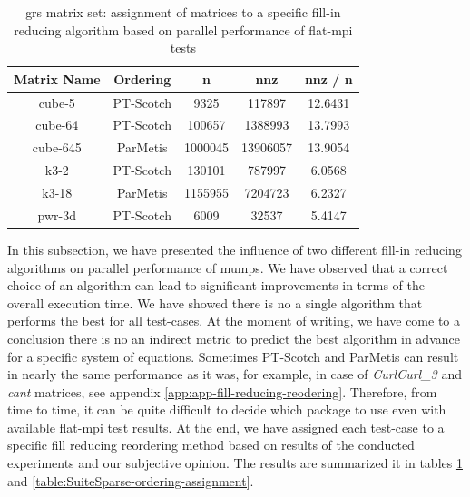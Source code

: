 \begin{table}[htpb]
\centering
\begin{tabular}{|c|c|c|c|c|}
\hline
Matrix Name & Ordering  & n       & nnz      & nnz / n \\ \hline
cube-5      & PT-Scotch & 9325    & 117897   & 12.6431 \\ \hline
cube-64     & PT-Scotch & 100657  & 1388993  & 13.7993 \\ \hline
cube-645    & ParMetis  & 1000045 & 13906057 & 13.9054 \\ \hline
k3-2        & PT-Scotch & 130101  & 787997   & 6.0568  \\ \hline
k3-18       & ParMetis  & 1155955 & 7204723  & 6.2327  \\ \hline
pwr-3d      & PT-Scotch & 6009    & 32537    & 5.4147  \\ \hline
\end{tabular}
\caption{\gls{grs} matrix set: assignment of matrices to a specific fill-in reducing algorithm based on parallel performance of flat-\gls{mpi} tests}
\label{table:GRS-ordering-assignment}
\end{table}


In this subsection, we have presented the influence of  two different fill-in reducing algorithms on parallel performance of \gls{mumps}. We have observed that a correct choice of an algorithm can lead to significant improvements in terms of the overall execution time. We have showed there is no a single algorithm that performs the best for all test-cases. At the moment of writing, we have come to a conclusion there is no an indirect metric to predict the best algorithm in advance for a specific system of equations. Sometimes PT-Scotch and ParMetis can result in nearly the same performance as it was, for example, in case of \textit{CurlCurl\_3} and \textit{cant} matrices, see appendix \ref{app:app-fill-reducing-reodering}. Therefore, from time to time, it can be quite difficult to decide which package to use even with available flat-\gls{mpi} test results. At the end, we have assigned each test-case to a specific fill reducing reordering method based on results of the conducted experiments and our subjective opinion. The results are summarized it in tables \ref{table:GRS-ordering-assignment} and \ref{table:SuiteSparse-ordering-assignment}. \\ 


